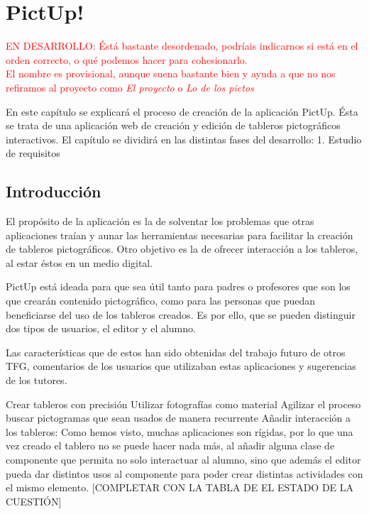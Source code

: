 \chapter{PictUp!}
\label{cap:introduccion}


\textcolor{red}{EN DESARROLLO: Éstá bastante desordenado, podríais indicarnos si está en el orden correcto, o qué podemos hacer para cohesionarlo. \\ El nombre es provisional, aunque suena bastante bien y ayuda a que no nos refiramos al proyecto como \textit{El proyecto} o \textit{Lo de los pictos}}



\begin{resumen}

	
	
	En este capítulo se explicará el proceso de creación de la aplicación PictUp. Ésta se trata de una aplicación web de creación y edición de tableros pictográficos interactivos. El capítulo se dividirá en las distintas fases del desarrollo: 1. Estudio de requisitos 
	
\end{resumen}

\label{cap1:sec:Motivacion}


\section{Introducción}

El propósito de la aplicación es la de solventar los problemas que otras aplicaciones traían y aunar las herramientas necesarias para facilitar la creación de tableros pictográficos. Otro objetivo es la de ofrecer interacción a los tableros, al estar éstos en un medio digital. 

PictUp está ideada para que sea útil tanto para padres o profesores que son los que crearán contenido pictográfico, como para las personas que puedan beneficiarse del uso de los tableros creados. Es por ello, que se pueden distinguir dos tipos de usuarios, el editor y el alumno. 

Las características que de estos han sido obtenidas del trabajo futuro de otros TFG, comentarios de los usuarios que utilizaban estas aplicaciones y sugerencias de los tutores.

Crear tableros con precisión
Utilizar fotografías como material
Agilizar el proceso buscar pictogramas que sean usados de manera recurrente
Añadir interacción a los tableros:
Como hemos visto, muchas aplicaciones son rígidas, por lo que una vez creado el tablero no se puede hacer nada más, al añadir alguna clase de componente que permita no solo interactuar al alumno, sino que además el editor pueda dar distintos usos al componente para poder crear distintas actividades con el mismo elemento.
[COMPLETAR CON LA TABLA DE EL ESTADO DE LA CUESTIÓN]




